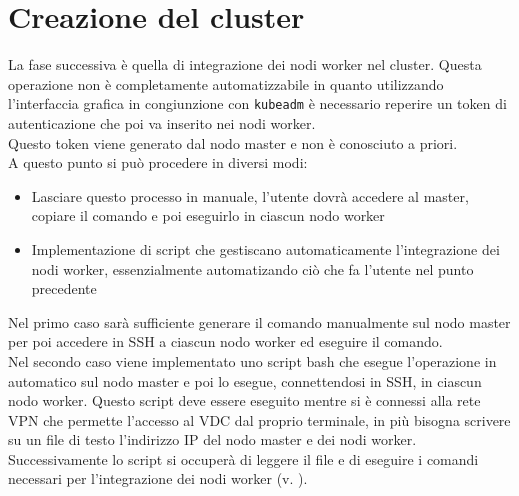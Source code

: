 \documentclass[12pt,a4paper,openright,twoside]{book}
\begin{document}
\section{Creazione del cluster}
La fase successiva è quella di integrazione dei nodi worker nel cluster. Questa operazione non è completamente automatizzabile in quanto utilizzando
l'interfaccia grafica in congiunzione con \texttt{kubeadm} è necessario reperire un token di autenticazione che poi va inserito nei nodi worker.\\
Questo token viene generato dal nodo master e non è conosciuto a priori.\\
A questo punto si può procedere in diversi modi:
\begin{itemize}
    \item Lasciare questo processo in manuale, l'utente dovrà accedere al master, copiare il comando e poi eseguirlo in ciascun nodo worker
    \item Implementazione di script che gestiscano automaticamente l'integrazione dei nodi worker, essenzialmente automatizando ciò che fa l'utente nel punto precedente
\end{itemize}
Nel primo caso sarà sufficiente generare il comando manualmente sul nodo master per poi accedere in SSH a ciascun nodo worker ed eseguire il comando.\\
Nel secondo caso viene implementato uno script bash che esegue l'operazione in automatico sul nodo master e poi lo esegue, connettendosi in SSH, in ciascun nodo worker. 
Questo script deve essere eseguito mentre si è connessi alla rete VPN che permette l'accesso al VDC dal proprio terminale, in più bisogna scrivere su un file di testo l'indirizzo IP del nodo master e dei nodi worker.
Successivamente lo script si occuperà di leggere il file e di eseguire i comandi necessari per l'integrazione dei nodi worker (v. ).

\end{document}
